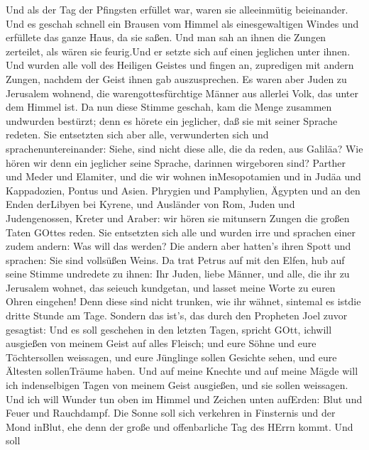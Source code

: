  Und als der Tag der Pfingsten erfüllet war, waren sie
alleeinmütig beieinander.  Und es geschah schnell ein
Brausen vom Himmel als einesgewaltigen Windes und erfüllete das ganze
Haus, da sie saßen.  Und man sah an ihnen die Zungen
zerteilet, als wären sie feurig.Und er setzte sich auf einen jeglichen
unter ihnen.  Und wurden alle voll des Heiligen Geistes und
fingen an, zupredigen mit andern Zungen, nachdem der Geist ihnen gab
auszusprechen.  Es waren aber Juden zu Jerusalem wohnend,
die warengottesfürchtige Männer aus allerlei Volk, das unter dem Himmel
ist.  Da nun diese Stimme geschah, kam die Menge zusammen
undwurden bestürzt; denn es hörete ein jeglicher, daß sie mit seiner
Sprache redeten.  Sie entsetzten sich aber alle,
verwunderten sich und sprachenuntereinander: Siehe, sind nicht diese
alle, die da reden, aus Galiläa?  Wie hören wir denn ein
jeglicher seine Sprache, darinnen wirgeboren sind?  Parther
und Meder und Elamiter, und die wir wohnen inMesopotamien und in Judäa
und Kappadozien, Pontus und Asien.  Phrygien und
Pamphylien, Ägypten und an den Enden derLibyen bei Kyrene, und Ausländer
von Rom,  Juden und Judengenossen, Kreter und Araber: wir
hören sie mitunsern Zungen die großen Taten GOttes reden. 
Sie entsetzten sich alle und wurden irre und sprachen einer zudem
andern: Was will das werden?  Die andern aber hatten's
ihren Spott und sprachen: Sie sind vollsüßen Weins.  Da
trat Petrus auf mit den Elfen, hub auf seine Stimme undredete zu ihnen:
Ihr Juden, liebe Männer, und alle, die ihr zu Jerusalem wohnet, das
seieuch kundgetan, und lasset meine Worte zu euren Ohren eingehen!
 Denn diese sind nicht trunken, wie ihr wähnet, sintemal es
istdie dritte Stunde am Tage.  Sondern das ist's, das durch
den Propheten Joel zuvor gesagtist:  Und es soll geschehen
in den letzten Tagen, spricht GOtt, ichwill ausgießen von meinem Geist
auf alles Fleisch; und eure Söhne und eure Töchtersollen weissagen, und
eure Jünglinge sollen Gesichte sehen, und eure Ältesten sollenTräume
haben.  Und auf meine Knechte und auf meine Mägde will ich
indenselbigen Tagen von meinem Geist ausgießen, und sie sollen
weissagen.  Und ich will Wunder tun oben im Himmel und
Zeichen unten aufErden: Blut und Feuer und Rauchdampf.  Die
Sonne soll sich verkehren in Finsternis und der Mond inBlut, ehe denn
der große und offenbarliche Tag des HErrn kommt.  Und soll
